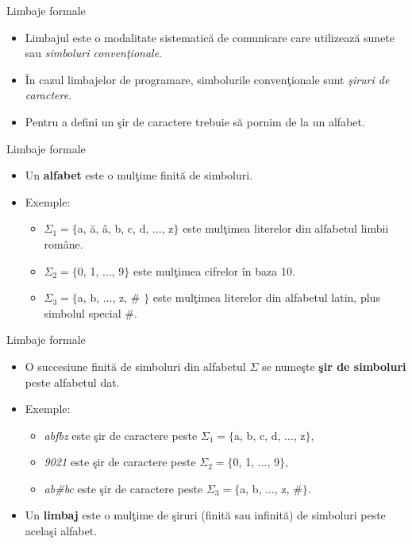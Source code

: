 \documentclass[pdf]{beamer}
\begin{document}
\begin{frame}{Limbaje formale}
\begin{itemize}
\item
Limbajul este o modalitate sistematică de comunicare care utilizează sunete sau \textit{simboluri convenţionale}. 
\item
În cazul limbajelor de programare, simbolurile convenţionale sunt \textit{şiruri de caractere}.
\item
Pentru a defini un şir de caractere trebuie să pornim de la un alfabet.
\end{itemize}
\end{frame}



\begin{frame}{Limbaje formale}
\begin{itemize}
\item
Un \textbf{alfabet} este o mulţime finită de simboluri.
\item
Exemple:
\begin{itemize}
\item
$\Sigma_{1} = \{$a, ă, â, b, c, d, $\dots$, z$\}$ este mulţimea literelor din alfabetul limbii române.
\item
$\Sigma_{2} = \{$0, 1, $\dots$, 9$\}$ este mulţimea cifrelor în baza 10.
\item
$\Sigma_{3} = \{$a, b, $\dots$, z, \# $\}$ este mulţimea literelor din alfabetul latin, plus simbolul special $\#$.
\end{itemize}
\end{itemize}
\end{frame}



\begin{frame}{Limbaje formale}
\begin{itemize}
\item
O succesiune finită de simboluri din alfabetul $\Sigma$ se numeşte \textbf{şir de simboluri} peste alfabetul dat.
\item
Exemple:
\begin{itemize}
\item
\textit{abfbz} este şir de caractere peste $\Sigma_{1} = \{$a, b, c, d, $\dots$, z$\}$,
\item
\textit{9021} este şir de caractere peste $\Sigma_{2} = \{$0, 1, $\dots$, 9$\}$,
\item
\textit{ab\#bc} este şir de caractere peste $\Sigma_{3} = \{$a, b, $\dots$, z, \#$\}$.
\end{itemize}
\item
Un \textbf{limbaj} este o mulţime de şiruri (finită sau infinită) de simboluri peste acelaşi alfabet.
\end{itemize}
\end{frame}
\end{document}
